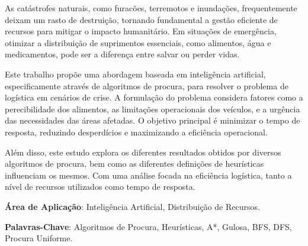\documentclass[a4paper,12pt]{scrreprt}
\begin{document}




\makecover






\renewenvironment{abstract}
 {\par\noindent\textbf{\Large\abstractname}\par\bigskip}
 {}

\begin{flushleft}
\begin{abstract}
    As catástrofes naturais, como furacões, terremotos e inundações, frequentemente deixam um rasto
    de destruição, tornando fundamental a gestão eficiente de recursos para mitigar o impacto humanitário.
    Em situações de emergência, otimizar a distribuição de suprimentos essenciais, como alimentos, água e
    medicamentos, pode ser a diferença entre salvar ou perder vidas.

    Este trabalho propõe uma abordagem baseada em inteligência artificial, especificamente através de algoritmos
    de procura, para resolver o problema de logística em cenários de crise. A formulação do problema considera
    fatores como a perecibilidade dos alimentos, as limitações operacionais dos veículos, e a urgência das necessidades
    das áreas afetadas. O objetivo principal é minimizar o tempo de resposta, reduzindo desperdícios e maximizando a
    eficiência operacional.

    Além disso, este estudo explora os diferentes resultados obtidos por diversos algoritmos de procura, bem como as
    diferentes definições de heurísticas influenciam os mesmos.
    Com uma análise focada na eficiência logística, tanto a nível de recursos utilizados como tempo de resposta.
    
    \par \textbf{Área de Aplicação}: Inteligência Artificial, Distribuição de Recursos.
    \par \textbf{Palavras-Chave}: Algoritmos de Procura, Heurísticas, A*, Gulosa, BFS, DFS, Procura Uniforme.
\end{abstract}
\end{flushleft}
\end{document}
